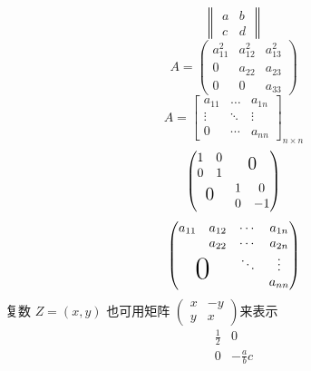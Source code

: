 \documentclass[12pt]{ctexbook}  %
\begin{document}
	\[
	\begin{Vmatrix}
		a & b \\ c & d
	\end{Vmatrix}
	\]
	\[
	A = \begin{pmatrix}
		a_{11}^2 & a_{12}^2 & a_{13}^2 \\
		0 & a_{22} & a_{23} \\
		0 & 0 & a_{33}
	\end{pmatrix}
	\]
	\[
	A = \begin{bmatrix}
		a_{11} & \dots & a_{1n} \\
		\vdots & \ddots & \vdots \\
		0 & \cdots & a_{nn}
	\end{bmatrix}_{n \times n}
	\]
	\[
	\begin{pmatrix}
	\begin{matrix}
		1&0\\0&1
	\end{matrix}
	& \text{\Large 0} \\
	\text{\Large 0} & \begin{matrix}
		1&0\\0&-1
	\end{matrix}
	\end{pmatrix}
	\]
	\[
	\begin{pmatrix}
		a_{11} & a_{12} & \cdots & a_{1n} \\
		& a_{22} & \cdots & a_{2n} \\
		&        & \ddots & \vdots \\
		\multicolumn{2}{c}{\raisebox{1.3ex}[0pt]{\Huge 0}}
		&        &a_{nn}
	\end{pmatrix}
	\]
	复数 $Z = (x,y)$ 也可用矩阵
	\begin{math}
		\left(
		\begin{smallmatrix}
			x & -y \\ y & x
		\end{smallmatrix}
		\right)
	\end{math}来表示
	\[
	\begin{array}{r|r}
		\frac12 & 0 \\
		\hline
		0 & -\frac abc \\
	\end{array}
	\]
	
	
\end{document}
